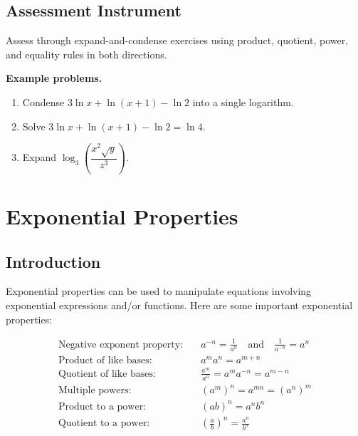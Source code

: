 \subsection{Assessment Instrument}
\label{ssec:asse-3669}


Assess through expand-and-condense exercises using product, quotient,
power, and equality rules in both directions.

\textbf{Example problems.}
\begin{enumerate}
    \item Condense $3\ln x + \ln(x+1) - \ln 2$ into a single logarithm.
    \item Solve $3\ln x + \ln(x+1) - \ln 2 = \ln 4$.
    \item Expand $\log_3\!\left(\dfrac{x^2\sqrt{y}}{z^3}\right)$.
\end{enumerate}



\section{Exponential Properties}
\label{sec:expo-7ac7}



\subsection{Introduction}
\label{sss:intr-8800}




Exponential properties can be used to manipulate equations involving exponential
expressions and/or functions. Here are some important exponential properties:



\begin{align} \text{Negative exponent property:} & \quad a^{-n} = \frac{1}{a^{n}} \quad \text{and} \quad \frac{1}{a^{-n}} = a^{n} \\ \text{Product of like bases:} & \quad a^m a^n = a^{m+n} \\ \text{Quotient of like bases:} & \quad \frac{a^m}{a^n} = a^m a^{-n} = a^{m-n} \\ \text{Multiple powers:} & \quad (a^m)^n = a^{mn} = (a^n)^m \\ \text{Product to a power:} & \quad (ab)^n = a^n b^n \\ \text{Quotient to a power:} & \quad \left(\frac{a}{b}\right)^n = \frac{a^n}{b^n} \end{align} 



